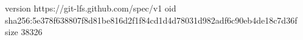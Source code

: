version https://git-lfs.github.com/spec/v1
oid sha256:5e378f638807f8d81be816d2f1f84cd1d4d78031d982adf6c90eb4de18c7d36f
size 38326
